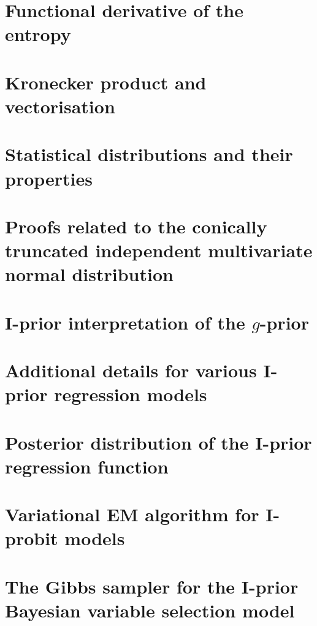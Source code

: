 \documentclass[showframe,11pt,twoside,openright]{report}
\begin{document}

\appendix

\chapter{Functional derivative of the entropy}\label{apx:funcder}
\thispagestyle{chapterapx}


\chapter{Kronecker product and vectorisation}
\thispagestyle{chapterapx}


\chapter{Statistical distributions and their properties}
\thispagestyle{chapterapx}


\chapter{Proofs related to the conically truncated independent multivariate normal distribution}\label{apx:contrunproof}
\thispagestyle{chapterapx}


\chapter{I-prior interpretation of the $g$-prior}\label{misc:gprior}
\thispagestyle{chapterapx}


\chapter{Additional details for various I-prior regression models}
\thispagestyle{chapterapx}


\chapter{Posterior distribution of the I-prior regression function}
\thispagestyle{chapterapx}


\chapter{Variational EM algorithm for I-probit models}\label{apx:varemiprobit}
\thispagestyle{chapterapx}


\chapter{The Gibbs sampler for the I-prior Bayesian variable selection model}\label{apx:gibbsbvs}
\thispagestyle{chapterapx}

 
\hClosingStuffStandalone
\end{document}
